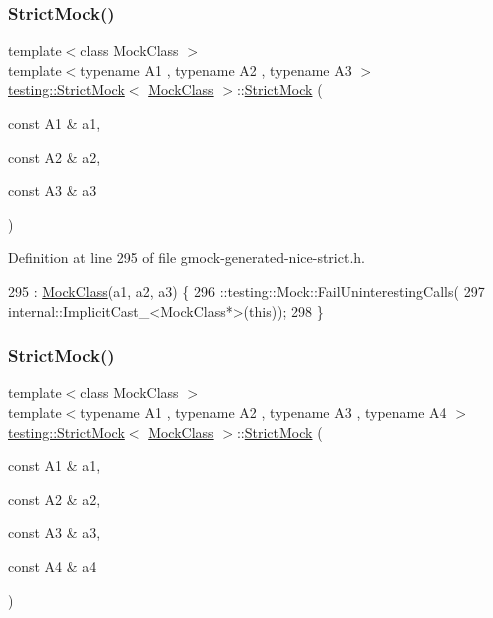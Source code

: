 \subsubsection{\texorpdfstring{Strict\+Mock()}{StrictMock()}\hspace{0.1cm}{\footnotesize\ttfamily [4/11]}}
{\footnotesize\ttfamily template$<$class Mock\+Class $>$ \\
template$<$typename A1 , typename A2 , typename A3 $>$ \\
\hyperlink{classtesting_1_1StrictMock}{testing\+::\+Strict\+Mock}$<$ \hyperlink{classMockClass}{Mock\+Class} $>$\+::\hyperlink{classtesting_1_1StrictMock}{Strict\+Mock} (\begin{DoxyParamCaption}\item[{const A1 \&}]{a1,  }\item[{const A2 \&}]{a2,  }\item[{const A3 \&}]{a3 }\end{DoxyParamCaption})\hspace{0.3cm}{\ttfamily [inline]}}



Definition at line 295 of file gmock-\/generated-\/nice-\/strict.\+h.


\begin{DoxyCode}
295                                                        : \hyperlink{classMockClass}{MockClass}(a1, a2, a3) \{
296     ::testing::Mock::FailUninterestingCalls(
297         internal::ImplicitCast\_<MockClass*>(\textcolor{keyword}{this}));
298   \}
\end{DoxyCode}
\mbox{\label{classtesting_1_1StrictMock_a6b42ef1460901ea91a2a09f44ae8fba2}} 
\subsubsection{\texorpdfstring{Strict\+Mock()}{StrictMock()}\hspace{0.1cm}{\footnotesize\ttfamily [5/11]}}
{\footnotesize\ttfamily template$<$class Mock\+Class $>$ \\
template$<$typename A1 , typename A2 , typename A3 , typename A4 $>$ \\
\hyperlink{classtesting_1_1StrictMock}{testing\+::\+Strict\+Mock}$<$ \hyperlink{classMockClass}{Mock\+Class} $>$\+::\hyperlink{classtesting_1_1StrictMock}{Strict\+Mock} (\begin{DoxyParamCaption}\item[{const A1 \&}]{a1,  }\item[{const A2 \&}]{a2,  }\item[{const A3 \&}]{a3,  }\item[{const A4 \&}]{a4 }\end{DoxyParamCaption})\hspace{0.3cm}{\ttfamily [inline]}}



